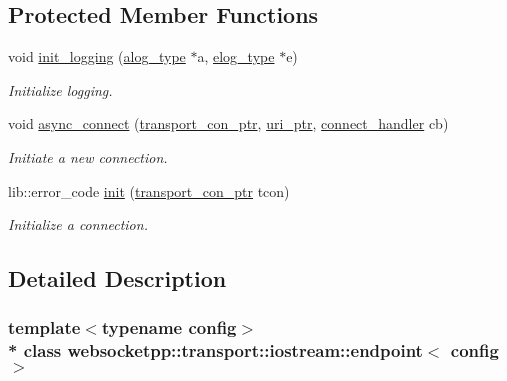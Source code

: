 \subsection*{Protected Member Functions}
\begin{DoxyCompactItemize}
\item 
void \hyperlink{classwebsocketpp_1_1transport_1_1iostream_1_1endpoint_a0c3fbf85313521d6d3a9a53faa2084ae}{init\+\_\+logging} (\hyperlink{classwebsocketpp_1_1transport_1_1iostream_1_1endpoint_af176dc3a44caefab71de271c27873c81}{alog\+\_\+type} $\ast$a, \hyperlink{classwebsocketpp_1_1transport_1_1iostream_1_1endpoint_a0aafebd80866c13bef4caa45e48a8ede}{elog\+\_\+type} $\ast$e)
\begin{DoxyCompactList}\small\item\em Initialize logging. \end{DoxyCompactList}\item 
void \hyperlink{classwebsocketpp_1_1transport_1_1iostream_1_1endpoint_a72e24fecb98d0445eb7df64d6b94a6a8}{async\+\_\+connect} (\hyperlink{classwebsocketpp_1_1transport_1_1iostream_1_1endpoint_a709bba4a4e1e2b7829abe4aa55de8078}{transport\+\_\+con\+\_\+ptr}, \hyperlink{namespacewebsocketpp_aae370ea5ac83a8ece7712cb39fc23f5b}{uri\+\_\+ptr}, \hyperlink{namespacewebsocketpp_1_1transport_ac392fca34e946b48414278c0c3addfa5}{connect\+\_\+handler} cb)
\begin{DoxyCompactList}\small\item\em Initiate a new connection. \end{DoxyCompactList}\item 
lib\+::error\+\_\+code \hyperlink{classwebsocketpp_1_1transport_1_1iostream_1_1endpoint_a9e169a6551db86bd1147b314924bd353}{init} (\hyperlink{classwebsocketpp_1_1transport_1_1iostream_1_1endpoint_a709bba4a4e1e2b7829abe4aa55de8078}{transport\+\_\+con\+\_\+ptr} tcon)
\begin{DoxyCompactList}\small\item\em Initialize a connection. \end{DoxyCompactList}\end{DoxyCompactItemize}


\subsection{Detailed Description}
\subsubsection*{template$<$typename config$>$\\*
class websocketpp\+::transport\+::iostream\+::endpoint$<$ config $>$}



